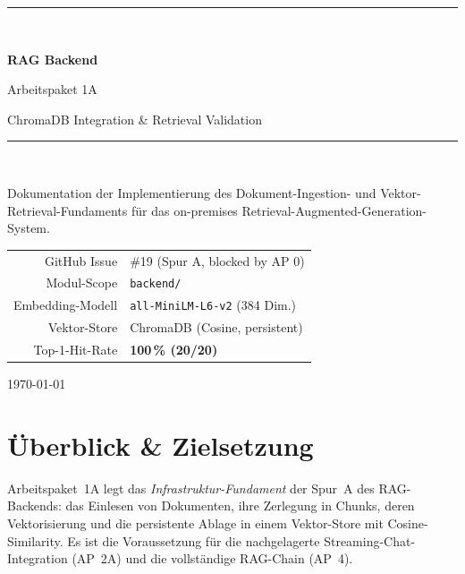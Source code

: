 \documentclass[11pt,a4paper]{article}
\begin{document}
\begin{titlepage}
\centering
\vspace*{2.2cm}
{\color{accent}\rule{\linewidth}{1.4pt}}\\[0.5cm]
{\Huge\bfseries RAG Backend\par}
\vspace{0.35cm}
{\LARGE Arbeitspaket 1A\par}
\vspace{0.2cm}
{\Large ChromaDB Integration \& Retrieval Validation\par}
{\color{accent}\rule{\linewidth}{1.4pt}}\\[1.1cm]

\begin{minipage}{0.85\linewidth}
\centering\large
Dokumentation der Implementierung des Dokument-Ingestion- und Vektor-Retrieval-Fundaments
für das on-premises Retrieval-Augmented-Generation-System.
\end{minipage}

\vfill
\begin{tabular}{rl}
\toprule
GitHub Issue & \#19 (Spur A, blocked by AP 0)\\
Modul-Scope & \texttt{backend/}\\
Embedding-Modell & \texttt{all-MiniLM-L6-v2} (384 Dim.)\\
Vektor-Store & ChromaDB (Cosine, persistent)\\
Top-1-Hit-Rate & \textbf{100\,\% (20/20)}\\
\bottomrule
\end{tabular}

\vspace{1.2cm}
{\color{codecom}\today}
\end{titlepage}

\tableofcontents
\newpage

\section{Überblick \& Zielsetzung}
Arbeitspaket~1A legt das \emph{Infrastruktur-Fundament} der Spur~A des RAG-Backends:
das Einlesen von Dokumenten, ihre Zerlegung in Chunks, deren Vektorisierung und die
persistente Ablage in einem Vektor-Store mit Cosine-Similarity. Es ist die
Voraussetzung für die nachgelagerte Streaming-Chat-Integration (AP~2A) und die
vollständige RAG-Chain (AP~4).
\end{document}
